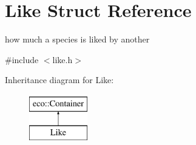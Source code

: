 \hypertarget{structLike}{
\section{Like Struct Reference}
\label{structLike}
}


how much a species is liked by another  




{\ttfamily \#include $<$like.h$>$}

Inheritance diagram for Like:\begin{figure}[H]
\begin{center}
\leavevmode
\includegraphics[height=2.000000cm]{structLike}
\end{center}
\end{figure}
